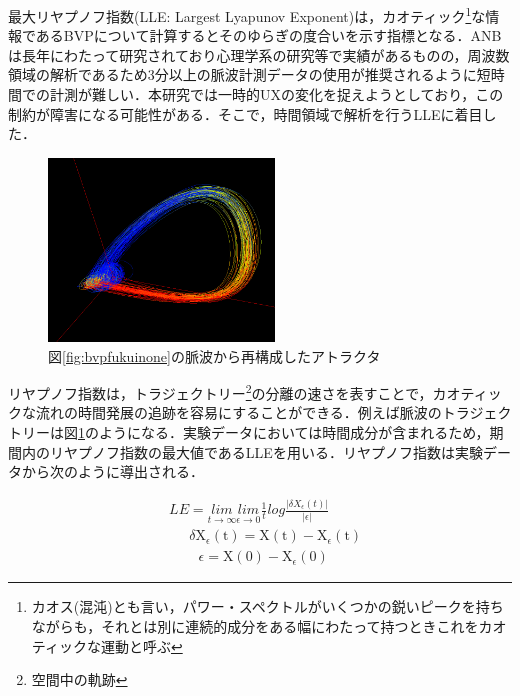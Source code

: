 最大リヤプノフ指数(LLE: Largest Lyapunov Exponent)は，カオティック\footnote{カオス(混沌)とも言い，パワー・スペクトルがいくつかの鋭いピークを持ちながらも，それとは別に連続的成分をある幅にわたって持つときこれをカオティックな運動と呼ぶ\cite{berje}}な情報であるBVPについて計算するとそのゆらぎの度合いを示す指標となる\cite{oyama2012}．ANBは長年にわたって研究されており心理学系の研究等で実績があるものの，周波数領域の解析であるため3分以上の脈波計測データの使用が推奨されるように短時間での計測が難しい．本研究では一時的UX\cite{uxwhitepaper}の変化を捉えようとしており，この制約が障害になる可能性がある．そこで，時間領域で解析を行うLLEに着目した．

\begin{figure}[htbp]
    \begin{center}
       \includegraphics[width=60mm]{img/atr_fukui_none.png}
    \end{center}
    \caption{図\ref{fig:bvpfukuinone}の脈波から再構成したアトラクタ}
    \label{fig:atrfukuinone}
\end{figure}

リヤプノフ指数は，トラジェクトリー\footnote{空間中の軌跡}の分離の速さを表すことで，カオティックな流れの時間発展の追跡を容易にすることができる\cite{berje}．例えば脈波のトラジェクトリーは図\ref{fig:atrfukuinone}のようになる．実験データにおいては時間成分が含まれるため，期間内のリヤプノフ指数の最大値であるLLEを用いる．リヤプノフ指数は実験データから次のように導出される\cite{hu}．


\begin{align*}
&LE= \underset{t\rightarrow\infty}{lim} \underset{\epsilon\rightarrow 0}{lim}\frac{1}{t}log\frac{\vert \delta X_{\epsilon}(t)\vert}{\vert \epsilon\vert} \tag{2}\\ 
& \quad\ \ \delta\mathrm{X}_{\epsilon}(\mathrm{t})=\mathrm{X}(\mathrm{t})-\mathrm{X}_{\epsilon}(\mathrm{t}) \tag{3}\\ 
& \quad\ \ \ \ \ \epsilon=\mathrm{X}(0)-\mathrm{X}_{\epsilon}(0) \tag{4} 
\end{align*}


